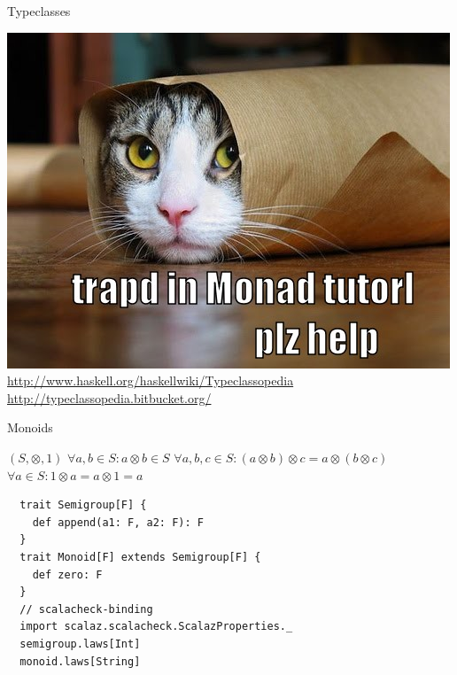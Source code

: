 \documentclass{beamer}
\begin{document}
\begin{frame}[fragile]{Typeclasses}
  \begin{center}
    \includegraphics[scale=0.3]{monad_tutorial}\newline
    {\large \url{http://www.haskell.org/haskellwiki/Typeclassopedia} }
    {\large \url{http://typeclassopedia.bitbucket.org/} }
  \end{center}
\end{frame}

\begin{frame}[fragile]{Monoids}
\begin{center}
$(S, \otimes, 1)$\newline
$\forall a, b \in S: a \otimes b \in S$\newline
$\forall a, b, c \in S: (a \otimes b) \otimes c = a \otimes (b \otimes c)$\newline
$\forall a \in S: 1 \otimes a = a \otimes 1 = a$\newline
\end{center}
  \begin{verbatim}
  trait Semigroup[F] {
    def append(a1: F, a2: F): F
  }
  trait Monoid[F] extends Semigroup[F] {
    def zero: F
  }
  // scalacheck-binding
  import scalaz.scalacheck.ScalazProperties._
  semigroup.laws[Int]
  monoid.laws[String]
  \end{verbatim}
\end{frame}
\end{document}
